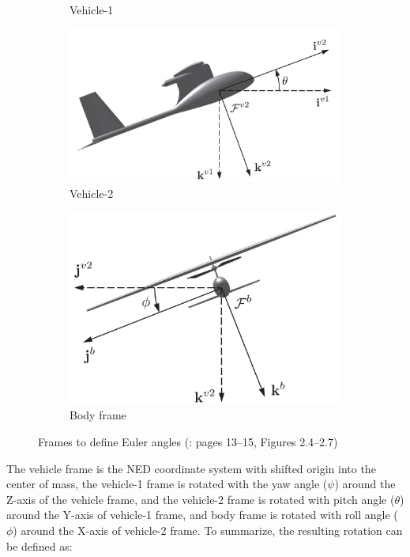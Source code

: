 \begin{figure}[!ht]
\begin{subfigure}{0.38\textwidth}
         \caption{Vehicle-1}\label{fig:vehicle-1}
    \end{subfigure}
    \begin{subfigure}{0.38\textwidth}
        \centering
         \includegraphics[width=\textwidth]{figures/vehicle-2.png}
         \caption{Vehicle-2}\label{fig:vehicle-2}
    \end{subfigure}
    \begin{subfigure}{0.38\textwidth}
        \centering
         \includegraphics[width=\textwidth]{figures/body.png}
         \caption{Body frame}\label{fig:body}
    \end{subfigure}\label{fig:frames}
    \caption{Frames to define Euler angles (\cite{EKF-UAS-2}: pages 13--15, Figures 2.4--2.7)}
\end{figure}

The vehicle frame is the NED coordinate system with shifted origin into the center of mass, the vehicle-1 frame is rotated with the yaw angle ($\psi$)  around the Z-axis of the vehicle frame, and the vehicle-2 frame is rotated with pitch angle ($\theta$) around the Y-axis of vehicle-1 frame, and body frame is rotated with roll angle ($\phi$) around the X-axis of vehicle-2 frame. To summarize, the resulting rotation can be defined as:

